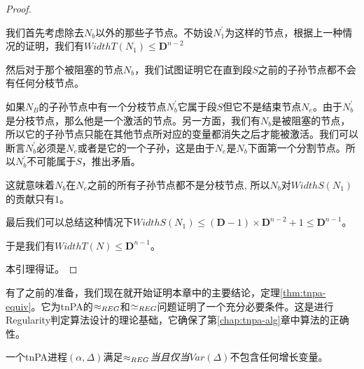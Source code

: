 \begin{proof}
\begin{enumerate}
\begin{enumerate}
我们首先考虑除去$N_b$以外的那些子节点。不妨设$N_1^{'}$为这样的节点，根据上一种情况的证明，我们有$WidthT(N_1)\leq\mathbf{D}^{n-2}$

然后对于那个被阻塞的节点$N_b$，我们试图证明它在直到段$S$之前的子孙节点都不会有任何分枝节点。

如果$N_B$的子孙节点中有一个分枝节点$N_b^{'}$它属于段$S$但它不是结束节点$N_e$。由于$N_b^{'}$是分枝节点，那么他是一个激活的节点。另一方面，我们有$N_b$是被阻塞的节点，所以它的子孙节点只能在其他节点所对应的变量都消失之后才能被激活。我们可以断言$N_b^{'}$必须是$N_e$或者是它的一个子孙，这是由于$N_e$是$N_b$下面第一个分割节点。所以$N_b^{'}$不可能属于$S$，推出矛盾。

这就意味着$N_b$在$N_e$之前的所有子孙节点都不是分枝节点, 所以$N_b$对$WidthS(N_1)$的贡献只有$1$。

最后我们可以总结这种情况下$WidthS(N_1)\leq (\mathbf{D}-1)\times \mathbf{D}^{n-2}+1\leq \mathbf{D}^{n-1}$。
\end{enumerate}
于是我们有$WidthT(N)\leq \mathbf{D}^{n-1}$。
\end{enumerate}
本引理得证。
\end{proof}

有了之前的准备，我们现在就开始证明本章中的主要结论，定理\ref{thm:tnpa-equiv}。它为tnPA的$\approx_{REG}$和$\simeq_{REG}$问题证明了一个充分必要条件。这是进行Regularity判定算法设计的理论基础，它确保了第\ref{chap:tnpa-alg}章中算法的正确性。

\begin{thm}\label{thm:tnpa-equiv}
一个tnPA进程$(\alpha,\Delta)$满足$\approx_{REG}$\emph{当且仅当}$Var(\Delta)$不包含任何增长变量。
\end{thm}

